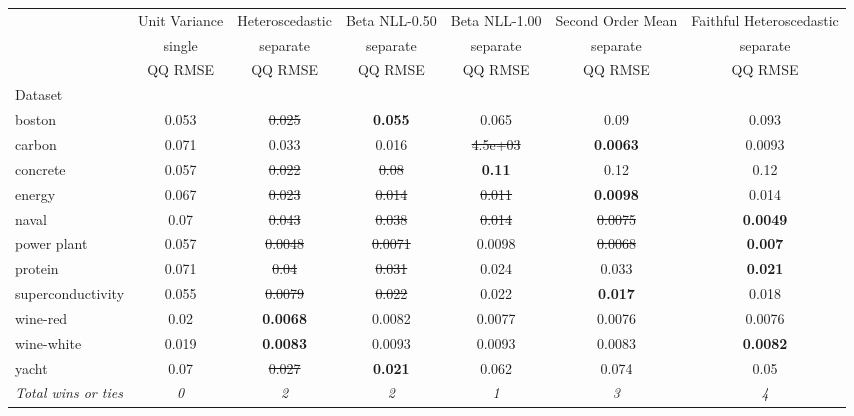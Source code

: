 \begin{tabular}{l|c|c|c|c|c|c}
\toprule
{} & {Unit Variance} & {Heteroscedastic} & {Beta NLL-0.50} & {Beta NLL-1.00} & {Second Order Mean} & {Faithful Heteroscedastic} \\
{} & {single} & {separate} & {separate} & {separate} & {separate} & {separate} \\
{} & {QQ RMSE} & {QQ RMSE} & {QQ RMSE} & {QQ RMSE} & {QQ RMSE} & {QQ RMSE} \\
{Dataset} & {} & {} & {} & {} & {} & {} \\
\midrule
boston & 0.053 & \sout{0.025} & \textbf{0.055} & 0.065 & 0.09 & 0.093 \\
carbon & 0.071 & 0.033 & 0.016 & \sout{4.5e+03} & \textbf{0.0063} & 0.0093 \\
concrete & 0.057 & \sout{0.022} & \sout{0.08} & \textbf{0.11} & 0.12 & 0.12 \\
energy & 0.067 & \sout{0.023} & \sout{0.014} & \sout{0.011} & \textbf{0.0098} & 0.014 \\
naval & 0.07 & \sout{0.043} & \sout{0.038} & \sout{0.014} & \sout{0.0075} & \textbf{0.0049} \\
power plant & 0.057 & \sout{0.0048} & \sout{0.0071} & 0.0098 & \sout{0.0068} & \textbf{0.007} \\
protein & 0.071 & \sout{0.04} & \sout{0.031} & 0.024 & 0.033 & \textbf{0.021} \\
superconductivity & 0.055 & \sout{0.0079} & \sout{0.022} & 0.022 & \textbf{0.017} & 0.018 \\
wine-red & 0.02 & \textbf{0.0068} & 0.0082 & 0.0077 & 0.0076 & 0.0076 \\
wine-white & 0.019 & \textbf{0.0083} & 0.0093 & 0.0093 & 0.0083 & \textbf{0.0082} \\
yacht & 0.07 & \sout{0.027} & \textbf{0.021} & 0.062 & 0.074 & 0.05 \\
\textit{{Total wins or ties}} & \textit{0} & \textit{2} & \textit{2} & \textit{1} & \textit{3} & \textit{4} \\
\bottomrule
\end{tabular}
